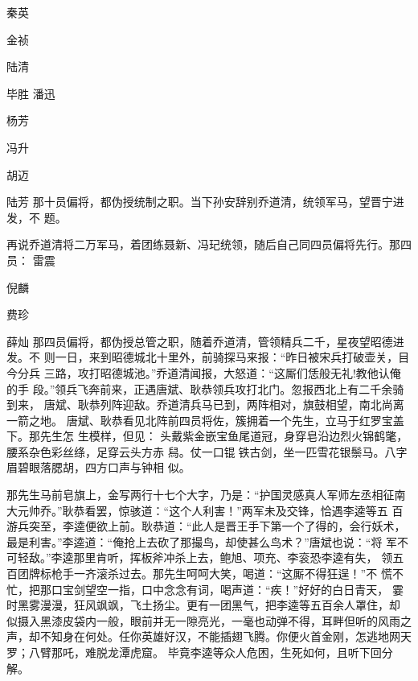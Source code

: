 秦英

金祯

陆清

毕胜
潘迅

杨芳

冯升

胡迈

陆芳
那十员偏将，都伪授统制之职。当下孙安辞别乔道清，统领军马，望晋宁进发，不
题。

再说乔道清将二万军马，着团练聂新、冯玘统领，随后自己同四员偏将先行。那四
员：
雷震

倪麟

费珍

薛灿
那四员偏将，都伪授总管之职，随着乔道清，管领精兵二千，星夜望昭德进发。不
则一日，来到昭德城北十里外，前骑探马来报：“昨日被宋兵打破壶关，目今分兵
三路，攻打昭德城池。”乔道清闻报，大怒道：“这厮们恁般无礼!教他认俺的手
段。”领兵飞奔前来，正遇唐斌、耿恭领兵攻打北门。忽报西北上有二千余骑到来，
唐斌、耿恭列阵迎敌。乔道清兵马已到，两阵相对，旗鼓相望，南北尚离一箭之地。
唐斌、耿恭看见北阵前四员将佐，簇拥着一个先生，立马于红罗宝盖下。那先生怎
生模样，但见：
头戴紫金嵌宝鱼尾道冠，身穿皂沿边烈火锦鹤氅，腰系杂色彩丝绦，足穿云头方赤
舄。仗一口锟铁古剑，坐一匹雪花银鬃马。八字眉碧眼落腮胡，四方口声与钟相
似。

那先生马前皂旗上，金写两行十七个大字，乃是：“护国灵感真人军师左丞相征南
大元帅乔。”耿恭看罢，惊骇道：“这个人利害！”两军未及交锋，恰遇李逵等五
百游兵突至，李逵便欲上前。耿恭道：“此人是晋王手下第一个了得的，会行妖术，
最是利害。”李逵道：“俺抢上去砍了那撮鸟，却使甚么鸟术？”唐斌也说：“将
军不可轻敌。”李逵那里肯听，挥板斧冲杀上去，鲍旭、项充、李衮恐李逵有失，
领五百团牌标枪手一齐滚杀过去。那先生呵呵大笑，喝道：“这厮不得狂逞！”不
慌不忙，把那口宝剑望空一指，口中念念有词，喝声道：“疾！”好好的白日青天，
霎时黑雾漫漫，狂风飒飒，飞土扬尘。更有一团黑气，把李逵等五百余人罩住，却
似摄入黑漆皮袋内一般，眼前并无一隙亮光，一毫也动弹不得，耳畔但听的风雨之
声，却不知身在何处。任你英雄好汉，不能插翅飞腾。你便火首金刚，怎逃地网天
罗；八臂那吒，难脱龙潭虎窟。
毕竟李逵等众人危困，生死如何，且听下回分解。
